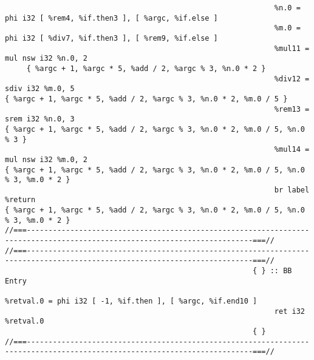 \begin{verbatim}
                                                              %n.0 = phi i32 [ %rem4, %if.then3 ], [ %argc, %if.else ]
                                                              %m.0 = phi i32 [ %div7, %if.then3 ], [ %rem9, %if.else ]
                                                              %mul11 = mul nsw i32 %n.0, 2
     { %argc + 1, %argc * 5, %add / 2, %argc % 3, %n.0 * 2 }
                                                              %div12 = sdiv i32 %m.0, 5
{ %argc + 1, %argc * 5, %add / 2, %argc % 3, %n.0 * 2, %m.0 / 5 }
                                                              %rem13 = srem i32 %n.0, 3
{ %argc + 1, %argc * 5, %add / 2, %argc % 3, %n.0 * 2, %m.0 / 5, %n.0 % 3 }
                                                              %mul14 = mul nsw i32 %m.0, 2
{ %argc + 1, %argc * 5, %add / 2, %argc % 3, %n.0 * 2, %m.0 / 5, %n.0 % 3, %m.0 * 2 }
                                                              br label %return
{ %argc + 1, %argc * 5, %add / 2, %argc % 3, %n.0 * 2, %m.0 / 5, %n.0 % 3, %m.0 * 2 }
//===--------------------------------------------------------------------------------------------------------------------------===//
//===--------------------------------------------------------------------------------------------------------------------------===//
                                                         { } :: BB Entry
                                                              %retval.0 = phi i32 [ -1, %if.then ], [ %argc, %if.end10 ]
                                                              ret i32 %retval.0
                                                         { }
//===--------------------------------------------------------------------------------------------------------------------------===//
\end{verbatim}
\endgroup

